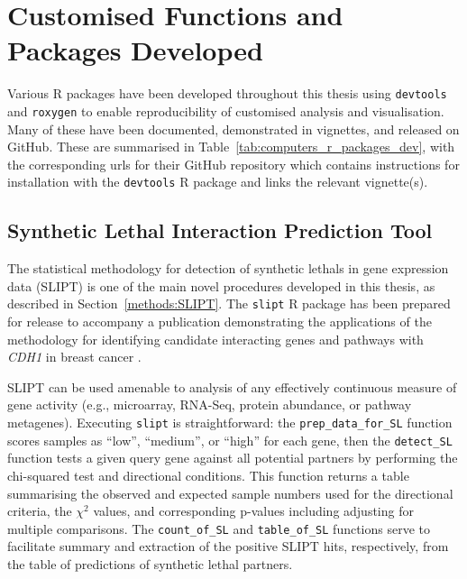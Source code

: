 \fi	

\FloatBarrier

\section{Customised Functions and Packages Developed} \label{methods:r_packages}

Various R packages \citep{R_core} have been developed throughout this thesis using \texttt{devtools} \citep{devtools} and \texttt{roxygen} \citep{roxygen} to enable reproducibility of customised analysis and visualisation. Many of these have been documented, demonstrated in vignettes, and released on GitHub. %
These are summarised in Table~\ref{tab:computers_r_packages_dev}, with the corresponding urls for their GitHub repository which contains instructions for installation with the \texttt{devtools} R package \citep{devtools} and links the relevant vignette(s).

\subsection{Synthetic Lethal Interaction Prediction Tool}
The statistical methodology for detection of \glspl{synthetic lethal} in \gls{gene expression} data (\gls{SLIPT}) is one of the main novel procedures developed in this thesis, as described in Section~\ref{methods:SLIPT}. The \texttt{slipt} R package has been prepared for release to accompany a publication demonstrating the applications of the methodology for identifying candidate interacting genes and pathways with \textit{CDH1} in breast cancer \citep{TCGA2012}.

\gls{SLIPT} can be used amenable to analysis of any effectively continuous measure of gene activity (e.g., \gls{microarray}, \gls{RNA-Seq}, protein abundance, or pathway \glspl{metagene}). Executing \texttt{slipt} is straightforward: the \texttt{prep\_data\_for\_SL} function scores samples as ``low'', ``medium'', or ``high'' for each gene, then the \texttt{detect\_SL} function tests a given query gene against all potential partners by performing the chi-squared test and directional conditions. This function returns a table summarising the observed and expected sample numbers used for the directional criteria, the $\chi^2$ values, and corresponding p-values including adjusting for multiple comparisons. The \texttt{count\_of\_SL} and \texttt{table\_of\_SL} functions serve to facilitate summary and extraction of the positive \gls{SLIPT} hits, respectively, from the table of predictions of \gls{synthetic lethal} partners.


